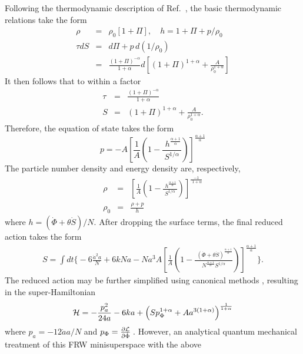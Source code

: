 Following the thermodynamic description of Ref.~\cite{14}, the basic thermodynamic relations take the form
\begin{eqnarray}
  \rho &=& \rho_0[1+\Pi], \quad h=1+\Pi+p/\rho_0 \\ \nonumber
  \tau dS &=&
  d\Pi+p\,d(1/\rho_0)\\
  &=&\frac{(1+\Pi)^{-\alpha}}{1+\alpha}d\left[(1+\Pi)^{1+\alpha}+\frac{A}{\rho_0^{1+\alpha} }\right]
\end{eqnarray}
It then follows that to within a factor
\begin{eqnarray}
  \tau &=& \frac{(1+\Pi)^{-\alpha}}{1+\alpha} \\
  S &=& (1+\Pi)^{1+\alpha}+\frac{A}{\rho_0^{1+\alpha}}.
\end{eqnarray}
Therefore, the equation of state takes the form
\begin{equation}
   p=-A\left[\frac{1}{A}\left(1-\frac{\,\,h^{\frac{\alpha+1}{\alpha}}}{S^{1/\alpha}}\right)\right]^{\frac{\alpha+1}{\alpha}}
\end{equation}
The particle number density and energy density are, respectively,
\begin{eqnarray}
  \rho &=& \left[\frac{1}{A}\left(1-\frac{\,\,h^{\frac{\alpha+1}{\alpha}}}{S^{1/\alpha}} \right) \right]^{\frac{-1}{\,\,1+\alpha}} \\
  \rho_0 &=& \frac{\rho+p}{h}
\end{eqnarray}
where $h=(\dot{\Phi}+\theta\dot{S})/N$. After dropping the surface terms, the final reduced action takes the form
\begin{eqnarray}
S = \int dt\biggr\{-6\frac{\dot a^2a}{N} + 6kNa -N a^3
A\left[\frac{1}{A}\left(1-\frac{\,\,(\dot{\Phi}+\theta\dot{S})^{\frac{\alpha+1}{\alpha}}}{N^{\frac{\alpha+1}{\alpha}}
S^{1/\alpha}}\right)\right]^{\frac{\alpha+1}{\alpha}}\biggr\}.
\end{eqnarray}
The reduced action may be further simplified using canonical methods \cite{14}, resulting in the super-Hamiltonian
\begin{equation}
{\cal H} = - \frac{p_a^2}{24a} -6ka +\left(S p_{\Phi}^{1+\alpha}+A a^{3(1+\alpha)} \right)^{\frac{1}{1+\alpha}}
\end{equation}
where $p_a= -12{\dot aa}/{N}$ and $p_\Phi =\frac{\partial{\cal
L}}{\partial \dot{\Phi}}\,$. However, an analytical quantum
mechanical treatment of this FRW minisuperspace with the above
